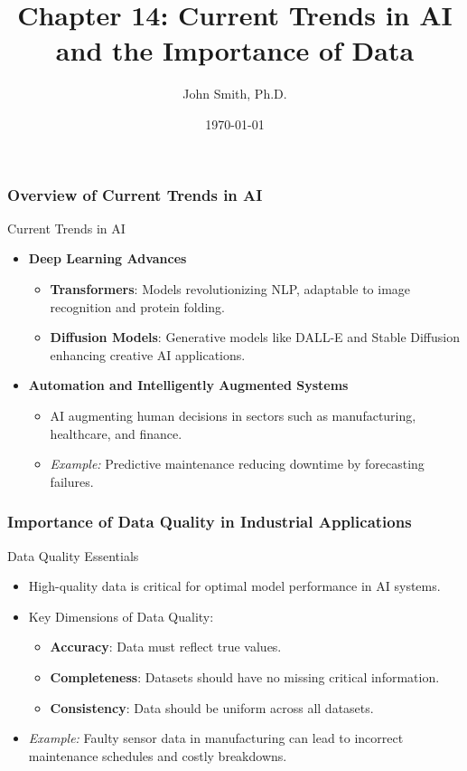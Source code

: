 \documentclass[aspectratio=169]{beamer}
\title[Current Trends in AI]{Chapter 14: Current Trends in AI and the Importance of Data}
\author[J. Smith]{John Smith, Ph.D.}
\institute[University Name]{
  Department of Computer Science\\
  University Name\\
  \vspace{0.3cm}
  Email: email@university.edu\\
  Website: www.university.edu
}
\date{\today}
\begin{document}
\frame{\titlepage}

\begin{frame}[fragile]
    \titlepage
\end{frame}

\begin{frame}[fragile]
    \frametitle{Overview of Current Trends in AI}
    
    \begin{block}{Current Trends in AI}
        \begin{itemize}
            \item \textbf{Deep Learning Advances}
            \begin{itemize}
                \item \textbf{Transformers}: Models revolutionizing NLP, adaptable to image recognition and protein folding.
                \item \textbf{Diffusion Models}: Generative models like DALL-E and Stable Diffusion enhancing creative AI applications.
            \end{itemize}
            
            \item \textbf{Automation and Intelligently Augmented Systems}
            \begin{itemize}
                \item AI augmenting human decisions in sectors such as manufacturing, healthcare, and finance.
                \item \textit{Example:} Predictive maintenance reducing downtime by forecasting failures.
            \end{itemize}
        \end{itemize}
    \end{block}
\end{frame}

\begin{frame}[fragile]
    \frametitle{Importance of Data Quality in Industrial Applications}
    
    \begin{block}{Data Quality Essentials}
        \begin{itemize}
            \item High-quality data is critical for optimal model performance in AI systems.
            \item Key Dimensions of Data Quality:
            \begin{itemize}
                \item \textbf{Accuracy}: Data must reflect true values.
                \item \textbf{Completeness}: Datasets should have no missing critical information.
                \item \textbf{Consistency}: Data should be uniform across all datasets.
            \end{itemize}
            \item \textit{Example:} Faulty sensor data in manufacturing can lead to incorrect maintenance schedules and costly breakdowns.
        \end{itemize}
    \end{block}
\end{frame}
\end{document}
